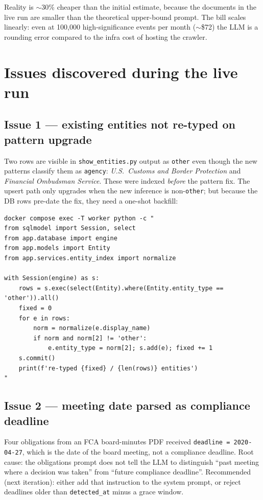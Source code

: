 \documentclass[11pt,a4paper]{article}
\begin{document}
Reality is $\sim$30\% cheaper than the initial estimate, because the
documents in the live run are smaller than the theoretical upper-bound
prompt. The bill scales linearly: even at 100{,}000 high-significance
events per month ($\sim$\$72) the LLM is a rounding error compared to
the infra cost of hosting the crawler.

\section{Issues discovered during the live run}

\subsection{Issue 1 --- existing entities not re-typed on pattern upgrade}

Two rows are visible in \texttt{show\_entities.py} output as
\texttt{other} even though the new patterns classify them as
\texttt{agency}: \textit{U.S.\ Customs and Border Protection} and
\textit{Financial Ombudsman Service}. These were indexed \emph{before}
the pattern fix. The upsert path only upgrades when the new inference
is non-\texttt{other}; but because the DB rows pre-date the fix, they
need a one-shot backfill:

\begin{lstlisting}[style=shell]
docker compose exec -T worker python -c "
from sqlmodel import Session, select
from app.database import engine
from app.models import Entity
from app.services.entity_index import normalize

with Session(engine) as s:
    rows = s.exec(select(Entity).where(Entity.entity_type == 'other')).all()
    fixed = 0
    for e in rows:
        norm = normalize(e.display_name)
        if norm and norm[2] != 'other':
            e.entity_type = norm[2]; s.add(e); fixed += 1
    s.commit()
    print(f're-typed {fixed} / {len(rows)} entities')
"
\end{lstlisting}

\subsection{Issue 2 --- meeting date parsed as compliance deadline}

Four obligations from an FCA board-minutes PDF received
\texttt{deadline = 2020-04-27}, which is the date of the board meeting,
not a compliance deadline. Root cause: the obligations prompt does not
tell the LLM to distinguish ``past meeting where a decision was taken''
from ``future compliance deadline''. Recommended (next iteration):
either add that instruction to the system prompt, or reject deadlines
older than \texttt{detected\_at} minus a grace window.
\end{document}
